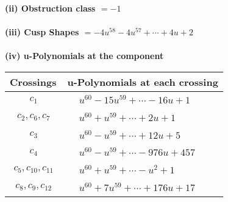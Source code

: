 \documentclass[1p]{elsarticle_modified}
\theoremstyle{definition}
\begin{document}
\flushleft \textbf{(ii) Obstruction class $= -1$}\\~\\
\flushleft \textbf{(iii) Cusp Shapes $= -4 u^{58}-4 u^{57}+\cdots+4 u+2$}\\~\\
\newpage\renewcommand{\arraystretch}{1}
\flushleft \textbf{(iv) u-Polynomials at the component}\newline \\
\begin{tabular}{m{50pt}|m{274pt}}
Crossings & \hspace{64pt}u-Polynomials at each crossing \\
\hline $$\begin{aligned}c_{1}\end{aligned}$$&$\begin{aligned}
&u^{60}-15 u^{59}+\cdots-16 u+1
\end{aligned}$\\
\hline $$\begin{aligned}c_{2},c_{6},c_{7}\end{aligned}$$&$\begin{aligned}
&u^{60}+u^{59}+\cdots+2 u+1
\end{aligned}$\\
\hline $$\begin{aligned}c_{3}\end{aligned}$$&$\begin{aligned}
&u^{60}- u^{59}+\cdots+12 u+5
\end{aligned}$\\
\hline $$\begin{aligned}c_{4}\end{aligned}$$&$\begin{aligned}
&u^{60}- u^{59}+\cdots-976 u+457
\end{aligned}$\\
\hline $$\begin{aligned}c_{5},c_{10},c_{11}\end{aligned}$$&$\begin{aligned}
&u^{60}+u^{59}+\cdots- u^2+1
\end{aligned}$\\
\hline $$\begin{aligned}c_{8},c_{9},c_{12}\end{aligned}$$&$\begin{aligned}
&u^{60}+7 u^{59}+\cdots+176 u+17
\end{aligned}$\\
\hline
\end{tabular}\\~\\
\end{document}
